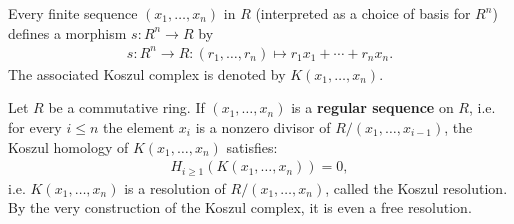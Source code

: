     \begin{example}
        Every finite sequence $(x_1,\ldots,x_n)$ in $R$ (interpreted as a choice of basis for $R^n$) defines a morphism $s:R^n\rightarrow R$ by
        \begin{gather}
            s:R^n\rightarrow R:(r_1,\ldots,r_n)\mapsto r_1x_1+\cdots+r_nx_n.
        \end{gather}
        The associated Koszul complex is denoted by $K(x_1,\ldots,x_n)$.
    \end{example}
    \begin{property}\label{homalg:koszul_resolution}
        Let $R$ be a commutative ring. If $(x_1,\ldots,x_n)$ is a \textbf{regular sequence} on $R$, i.e. for every $i\leq n$ the element $x_i$ is a nonzero divisor of $R/(x_1,\ldots,x_{i-1})$, the Koszul homology of $K(x_1,\ldots,x_n)$ satisfies:
        \begin{gather}
            H_{i\geq1}(K(x_1,\ldots,x_n)) = 0,
        \end{gather}
        i.e. $K(x_1,\ldots,x_n)$ is a resolution of $R/(x_1,\ldots,x_n)$, called the Koszul resolution. By the very construction of the Koszul complex, it is even a free resolution.
    \end{property}

